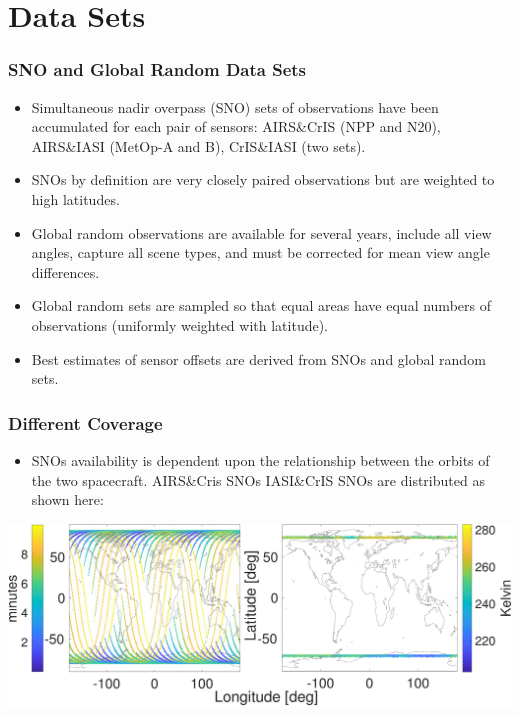\documentclass[10pt,t]{beamer}
\begin{document}
\section{Data Sets}
\begin{frame}
  \frametitle{SNO and Global Random Data Sets}
  \begin{itemize}
  \item Simultaneous nadir overpass (SNO) sets of observations have been accumulated for each pair of sensors: AIRS\&CrIS (NPP and N20),  AIRS\&IASI (MetOp-A and B), CrIS\&IASI (two sets).
  \item SNOs by definition are very closely paired observations but are weighted to high latitudes.
  \item Global random observations are available for several years, include all view angles, capture all scene types,  and must be corrected for mean view angle differences.
  \item Global random sets are sampled so that equal areas have equal numbers of observations (uniformly weighted with latitude).
    \item Best estimates of sensor offsets are derived from SNOs and global random sets.
  \end{itemize}
\end{frame}

\begin{frame}
  \frametitle{Different Coverage}
  \begin{itemize}
  \item SNOs availability is dependent upon the relationship between the orbits of the two spacecraft. AIRS\&Cris SNOs IASI\&CrIS SNOs are distributed as shown here:
  \end{itemize}

  \begin{center}
  \includegraphics[width=\linewidth]{./Figs/Pdf/fig3_resize.pdf}
  \end{center}

\end{frame}
\end{document}
